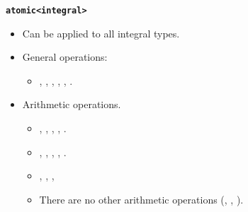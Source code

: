 \begin{frame}[t,fragile]{\texttt{\textbf{atomic<integral>}}}
\begin{itemize}
  \item Can be applied to all integral types.
  \item General operations:
    \begin{itemize}
      \item {}, , , , 
            , .
    \end{itemize}
  \item Arithmetic operations.
    \begin{itemize}
      \item {}, , , , .
      \item \cppid{+=}, \cppid{-=}, \cppid{\&=}, \cppid{|=}, \cppid{\^{}=}.
      \item {}, , , 
      \item There are no other arithmetic operations (\cppid{*}, \cppid{/}, \cppid{\%}).
    \end{itemize}
\end{itemize}
\end{frame}

